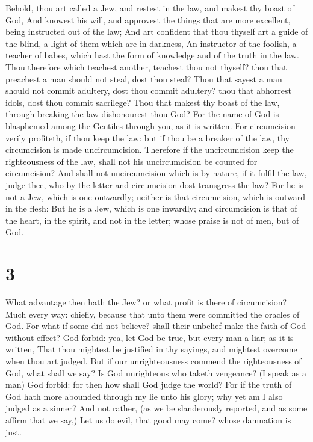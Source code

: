  Behold, thou art called a Jew, and restest in the law,
and makest thy boast of God,  And knowest his will, and
approvest the things that are more excellent, being instructed out of
the law;  And art confident that thou thyself art a guide
of the blind, a light of them which are in darkness,  An
instructor of the foolish, a teacher of babes, which hast the form of
knowledge and of the truth in the law.  Thou therefore
which teachest another, teachest thou not thyself? thou that preachest a
man should not steal, dost thou steal?  Thou that sayest
a man should not commit adultery, dost thou commit adultery? thou that
abhorrest idols, dost thou commit sacrilege?  Thou that
makest thy boast of the law, through breaking the law dishonourest thou
God?  For the name of God is blasphemed among the
Gentiles through you, as it is written.  For circumcision
verily profiteth, if thou keep the law: but if thou be a breaker of the
law, thy circumcision is made uncircumcision.  Therefore
if the uncircumcision keep the righteousness of the law, shall not his
uncircumcision be counted for circumcision?  And shall
not uncircumcision which is by nature, if it fulfil the law, judge thee,
who by the letter and circumcision dost transgress the law?
 For he is not a Jew, which is one outwardly; neither is
that circumcision, which is outward in the flesh:  But he
is a Jew, which is one inwardly; and circumcision is that of the heart,
in the spirit, and not in the letter; whose praise is not of men, but of
God.

\hypertarget{section-2}{%
\section{3}\label{section-2}}

 What advantage then hath the Jew? or what profit is there
of circumcision?  Much every way: chiefly, because that
unto them were committed the oracles of God.  For what if
some did not believe? shall their unbelief make the faith of God without
effect?  God forbid: yea, let God be true, but every man a
liar; as it is written, That thou mightest be justified in thy sayings,
and mightest overcome when thou art judged.  But if our
unrighteousness commend the righteousness of God, what shall we say? Is
God unrighteous who taketh vengeance? (I speak as a man) 
God forbid: for then how shall God judge the world?  For
if the truth of God hath more abounded through my lie unto his glory;
why yet am I also judged as a sinner?  And not rather, (as
we be slanderously reported, and as some affirm that we say,) Let us do
evil, that good may come? whose damnation is just.

